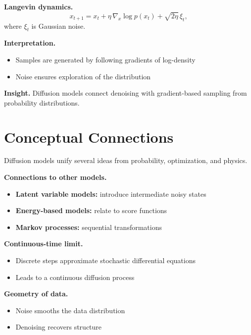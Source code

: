 \medskip

\noindent
\textbf{Langevin dynamics.}
\[
x_{t+1} = x_t + \eta \, \nabla_x \log p(x_t) + \sqrt{2\eta} \, \xi_t,
\]
where $\xi_t$ is Gaussian noise.

\medskip

\noindent
\textbf{Interpretation.}
\begin{itemize}
    \item Samples are generated by following gradients of log-density
    \item Noise ensures exploration of the distribution
\end{itemize}

\medskip

\noindent
\textbf{Insight.}  
Diffusion models connect denoising with gradient-based sampling from probability distributions.

\section{Conceptual Connections}

Diffusion models unify several ideas from probability, optimization, and physics.

\medskip

\noindent
\textbf{Connections to other models.}
\begin{itemize}
    \item \textbf{Latent variable models:} introduce intermediate noisy states
    \item \textbf{Energy-based models:} relate to score functions
    \item \textbf{Markov processes:} sequential transformations
\end{itemize}

\medskip

\noindent
\textbf{Continuous-time limit.}
\begin{itemize}
    \item Discrete steps approximate stochastic differential equations
    \item Leads to a continuous diffusion process
\end{itemize}

\medskip

\noindent
\textbf{Geometry of data.}
\begin{itemize}
    \item Noise smooths the data distribution
    \item Denoising recovers structure
\end{itemize}

